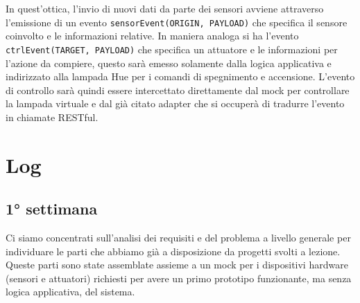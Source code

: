 In quest'ottica, l'invio di nuovi dati da parte dei sensori avviene attraverso l'emissione di un evento \texttt{sensorEvent(ORIGIN, PAYLOAD)} che specifica il sensore coinvolto e le informazioni relative. In maniera analoga si ha l'evento \texttt{ctrlEvent(TARGET, PAYLOAD)} che specifica un attuatore e le informazioni per l'azione da compiere, questo sarà emesso solamente dalla logica applicativa e indirizzato alla lampada Hue per i comandi di spegnimento e accensione. L'evento di controllo sarà quindi essere intercettato direttamente dal mock per controllare la lampada virtuale e dal già citato adapter che si occuperà di tradurre l'evento in chiamate RESTful.

\section{Log}

\subsection{1° settimana}
Ci siamo concentrati sull'analisi dei requisiti e del problema a livello generale per individuare le parti che abbiamo già a disposizione da progetti svolti a lezione. Queste parti sono state assemblate assieme a un mock per i dispositivi hardware (sensori e attuatori) richiesti per avere un primo prototipo funzionante, ma senza logica applicativa, del sistema.


